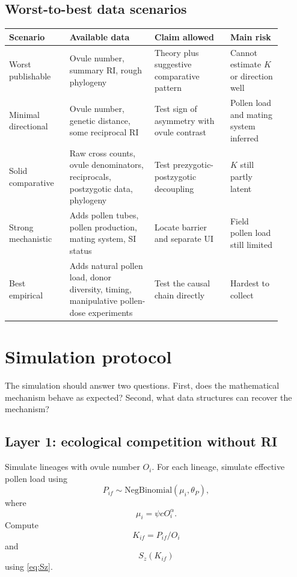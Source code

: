\documentclass[12pt]{article}
\begin{document}
\subsection{Worst-to-best data scenarios}

\begin{center}
\begin{tabular}{>{\raggedright\arraybackslash}p{0.20\linewidth} >{\raggedright\arraybackslash}p{0.28\linewidth} >{\raggedright\arraybackslash}p{0.25\linewidth} >{\raggedright\arraybackslash}p{0.17\linewidth}}
\toprule
Scenario & Available data & Claim allowed & Main risk \\
\midrule
Worst publishable & Ovule number, summary RI, rough phylogeny & Theory plus suggestive comparative pattern & Cannot estimate $K$ or direction well \\
Minimal directional & Ovule number, genetic distance, some reciprocal RI & Test sign of asymmetry with ovule contrast & Pollen load and mating system inferred \\
Solid comparative & Raw cross counts, ovule denominators, reciprocals, postzygotic data, phylogeny & Test prezygotic-postzygotic decoupling & $K$ still partly latent \\
Strong mechanistic & Adds pollen tubes, pollen production, mating system, SI status & Locate barrier and separate UI & Field pollen load still limited \\
Best empirical & Adds natural pollen load, donor diversity, timing, manipulative pollen-dose experiments & Test the causal chain directly & Hardest to collect \\
\bottomrule
\end{tabular}
\end{center}

\section{Simulation protocol}

The simulation should answer two questions. First, does the mathematical mechanism behave as expected? Second, what data structures can recover the mechanism?

\subsection{Layer 1: ecological competition without RI}

Simulate lineages with ovule number $O_i$. For each lineage, simulate effective pollen load using
\begin{equation}
P_{if}\sim \mathrm{NegBinomial}(\mu_i,\theta_P),
\end{equation}
where
\begin{equation}
\mu_i=\psi cO_i^\alpha.
\end{equation}
Compute
\begin{equation}
K_{if}=P_{if}/O_i
\end{equation}
and
\begin{equation}
S_z(K_{if})
\end{equation}
using \eqref{eq:Sz}.
\end{document}
